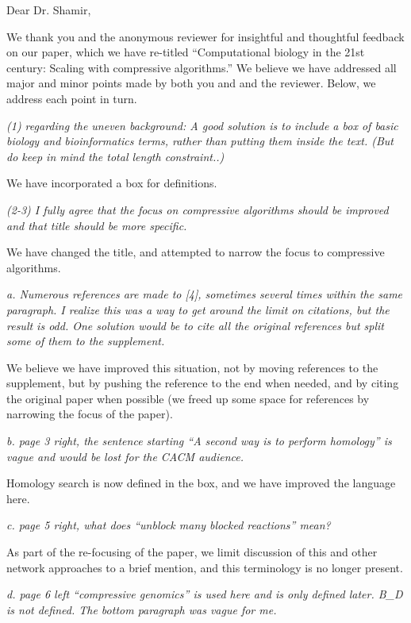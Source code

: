 \documentclass[12pt]{letter}
\begin{document}
\begin{letter}{}
\opening{Dear Dr. Shamir,}

\medskip

We thank you and the anonymous reviewer for insightful and thoughtful feedback
on our paper, which we have re-titled ``Computational biology in the 21st century: Scaling with compressive algorithms.'' We believe we have addressed
all major and minor points made by both you and and the reviewer.
Below, we address each point in turn.

\emph{(1) regarding the uneven background: A good solution is to include a box of basic biology and bioinformatics terms, rather than putting them inside the text. (But do keep in mind the total length constraint..)}

We have incorporated a box for definitions.
 
\emph{(2-3) I fully agree that the focus on compressive algorithms should be improved and that title should be more specific.}

We have changed the title, and attempted to narrow the focus to compressive algorithms. 
 
\emph{a. Numerous references are made to [4], sometimes several times within the same paragraph. I realize this was a way to get around the limit on citations, but the result is odd. One solution would be to cite all the original references but split some of them to the supplement.}

We believe we have improved this situation, not by moving references to the supplement, but by pushing the reference to the end when needed, and by citing
the original paper when possible (we freed up some space for references by narrowing the focus of the paper).

 
\emph{b. page 3 right, the sentence starting ``A second way is to perform homology'' is vague and would be lost for the CACM audience.}

Homology search is now defined in the box, and we have improved the language here.
 
\emph{c. page 5 right, what does ``unblock many blocked reactions'' mean?}

As part of the re-focusing of the paper, we limit discussion of this and other network approaches to a brief mention, and this terminology is no longer present.
 
\emph{d. page 6 left ``compressive genomics'' is used here and is only defined later. B_D is not defined. The bottom paragraph was vague for me. }


\end{letter}
\end{document}
